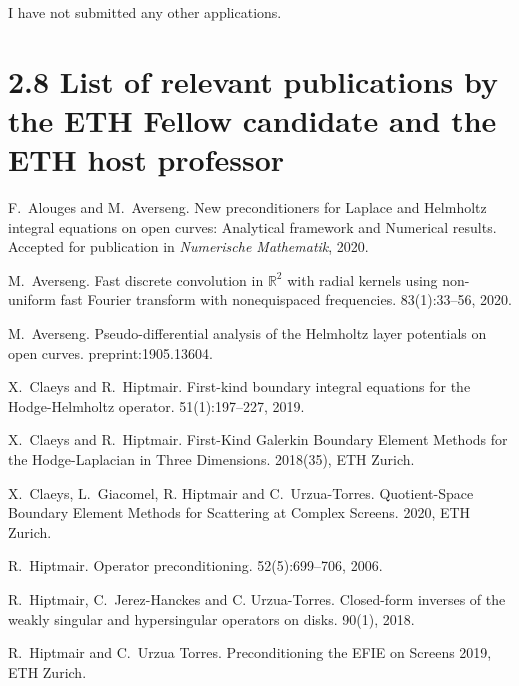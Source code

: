 \documentclass[]{article}
\begin{document}
I have not submitted any other applications.

\section*{2.8 List of relevant publications by the ETH Fellow candidate and the ETH host professor}

\begin{thebibliography}{0}
	F.~Alouges and M.~Averseng.
	\newblock New preconditioners for Laplace and Helmholtz integral equations on open curves: Analytical framework and Numerical results. 
	\newblock Accepted for publication in {\em Numerische Mathematik}, 2020.
	
	M.~Averseng.
	\newblock Fast discrete convolution in $\mathbb {R}^{2} $ with radial kernels using non-uniform fast Fourier transform with nonequispaced frequencies. 
	 83(1):33--56, 2020.
	
	M.~Averseng. 
	\newblock Pseudo-differential analysis of the Helmholtz layer potentials on open curves. 
	 preprint:1905.13604.
	
	X.~Claeys and R.~Hiptmair.
	\newblock First-kind boundary integral equations for the {H}odge-{H}elmholtz operator.
	 51(1):197--227, 2019.
	
	X.~Claeys and R.~Hiptmair.
	\newblock First-Kind Galerkin Boundary Element Methods for the {H}odge-{L}aplacian in Three Dimensions.
	 2018(35), ETH Zurich.
	
	X.~Claeys, L.~Giacomel, R. Hiptmair and C.~Urzua-Torres.
	\newblock Quotient-Space Boundary Element Methods for Scattering at Complex Screens.
	 2020, ETH Zurich.
	
	
	R.~Hiptmair.
	\newblock Operator preconditioning.
	 52(5):699--706, 2006.
	
	
	R.~Hiptmair, C.~Jerez-Hanckes and C. Urzua-Torres.
	\newblock Closed-form inverses of the weakly singular and hypersingular operators on disks.
	 90(1), 2018.
	
	R.~Hiptmair and C.~Urzua Torres.
	Preconditioning the EFIE on Screens
	 2019, ETH Zurich.
	


\end{thebibliography}
\end{document}
